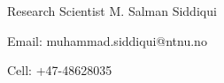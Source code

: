 

\begin{cventries}


  \cventry
  {Research Scientist} %
  {M. Salman Siddiqui} %
  {} %
  {} %
  {
  	\begin{cvitems} %
  		\item {Email: muhammad.siddiqui@ntnu.no}
  		\item {Cell: +47-48628035}
  	\end{cvitems}
  }


\end{cventries}
